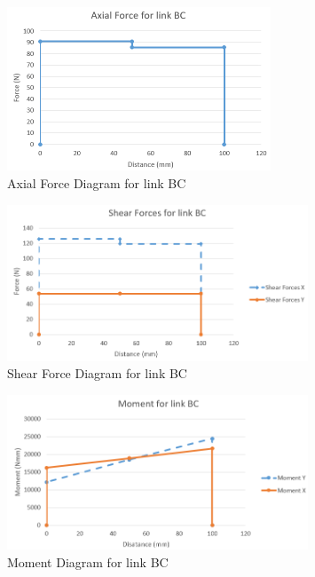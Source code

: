 \begin{figure}[H]
    \centering
    \includegraphics[width=0.7\textwidth]{7_Appendices/Images/BC_Axial.PNG}
    \caption{Axial Force Diagram for link BC}
    \label{fig:annex_limb_BC_axial}
\end{figure}
\begin{figure}[H]
    \centering
    \includegraphics[width=0.8\textwidth]{7_Appendices/Images/BC_Shear.PNG}
    \caption{Shear Force Diagram for link BC}
    \label{fig:annex_limb_BC_shear}
\end{figure}
\begin{figure}[H]
    \centering
    \includegraphics[width=0.8\textwidth]{7_Appendices/Images/BC_Moment.PNG}
    \caption{Moment Diagram for link BC}
    \label{fig:annex_limb_BC_moment}
\end{figure}
